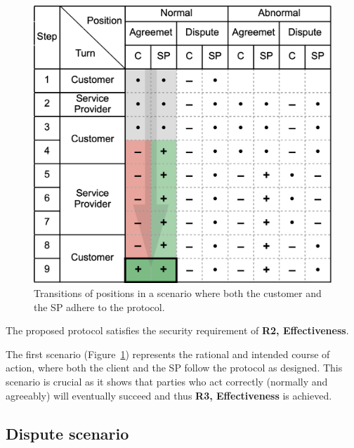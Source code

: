 \documentclass[pdftex,twocolumn,epjc3]{svjour3}
\begin{document}
\begin{figure}[h!]
\includegraphics[width=\linewidth]{rational.png}
\centering
\caption{Transitions of positions in a scenario where both the customer and the SP adhere to the protocol.}
\label{fig:rational}
\end{figure}

\begin{theorem}
The proposed protocol satisfies the security requirement of \textbf{R2, Effectiveness}.  
\end{theorem}

The first scenario (Figure~\ref{fig:rational}) represents the rational and intended course of action, where both the client and the SP follow the protocol as designed. This scenario is crucial as it shows that parties who act correctly (normally and agreeably) will eventually succeed and thus \textbf{R3, Effectiveness} is achieved.

\subsection{Dispute scenario}\label{sec:example-scenarios}
\end{document}
